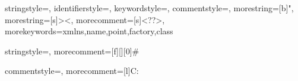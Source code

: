 {
  stringstyle=\color{black},
  identifierstyle=\color{darkblue},
  keywordstyle=\color{cyan},
  commentstyle=\color{darkgrey}\upshape,
  morestring=[b]",
  morestring=[s]{>}{<},
  morecomment=[s]{<?}{?>},
  morekeywords={xmlns,name,point,factory,class}%
}

{
  stringstyle=\color{black},
  morecomment=[f][\color{darkgrey}\upshape][0]\# %
}

{
  commentstyle=\color{darkblue},
  morecomment=[l]{C:}
}

\fi

\newcommand{\menu}[1]{\textsc{#1} menu}
\newcommand{\key}[1]{$<$\textsc{#1}$>$}
\newcommand{\altkey}[1]{$<$\textsc{alt}$>$+$<$\textsc{#1}$>$}
\newcommand{\ctrlkey}[1]{$<$\textsc{ctrl}$>$+$<$\textsc{#1}$>$}
\newcommand{\ctrlshiftkey}[1]{$<$\textsc{ctrl}$>$+$<$\textsc{shift}$>$+$<$\textsc{#1}$>$}
\newcommand{\contextmenu}[1]{\textsc{#1} context menu}
\newcommand{\button}[1]{\textsc{#1} button}
\newcommand{\tab}[1]{\textsc{#1} tab}
\newcommand{\icon}[1]{\textsc{#1} icon}
\newcommand{\wizard}[1]{\textit{#1} wizard}
\newcommand{\field}[1]{\textit{#1} field}
\newcommand{\outline}[1]{\textit{#1} outline}
\newcommand{\checkbox}[1]{\textit{#1} checkbox}
\newcommand{\node}[1]{\textit{#1} node}
\newcommand{\folder}[1]{\textit{#1} folder}
\newcommand{\link}[1]{\textit{#1} link}
\newcommand{\element}[1]{\textit{#1}}
\newcommand{\property}[1]{\textit{#1} property}
\newcommand{\java}[1]{\texttt{#1}}
\newcommand{\filename}[1]{\path{#1}}


\newcommand{\includediagram}[2]{
  \ifpdf
    \texttt{[image: \#2.pdf]}
  \else
    \texttt{[image: \#2.png]}
  \fi
}

\newcommand{\prtlabel}[1]{\label{prt:#1}}
\newcommand{\applabel}[1]{\label{apx:#1}}
\newcommand{\chalabel}[1]{\label{cha:#1}}
\newcommand{\seclabel}[1]{\label{sec:#1}}
\newcommand{\lstlabel}[1]{lst:#1}
\newcommand{\figlabel}[1]{\label{fig:#1}}
\newcommand{\tablabel}[1]{\label{tab:#1}}

